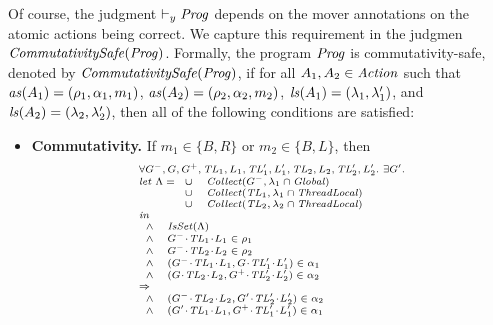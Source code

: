 Of course, the judgment $\vdash_y \mathit{Prog}$ depends on the mover annotations on the atomic actions being correct.
We capture this requirement in the judgmen $\mathit{CommutativitySafe}(\mathit{Prog})$.
Formally, the program $\mathit{Prog}$ is commutativity-safe, denoted by $\mathit{CommutativitySafe}(\mathit{Prog})$,
if for all $A_1,A_2 \in \mathit{Action}$ such that $\mathit{as}(A_1) = (\rho_1,\alpha_1,m_1)$, $\mathit{as}(A_2) = (\rho_2,\alpha_2,m_2)$,
$\mathit{ls}(A_1) = (\lambda_1,\lambda'_1)$, and $\mathit{ls}(A_2) = (\lambda_2,\lambda'_2)$, 
then all of the following conditions are satisfied:
\begin{itemize}
\item {\bf Commutativity.}
If $m_1 \in \{B,R\}$ or $m_2 \in \{B,L\}$, then 
\[
\scriptsize{
\begin{array}{l}
\forall \varsG^-,\varsG,\varsG^+,\varsTL_1,\varsL_1,\varsTL'_1,\varsL'_1,\varsTL_2,\varsL_2,\varsTL'_2,\varsL'_2.\ \exists \varsG'. \\
\mathit{let}\ \Lambda =
\begin{array}[t]{ll}
\cup & \Collect(\varsG^-, \lins_1 \cap \Global) \\
\cup & \Collect(\varsTL_1, \lins_1 \cap \ThreadLocal) \\
\cup & \Collect(\varsTL_2, \lins_2 \cap \ThreadLocal) 
\end{array} \\
\mathit{in} \\
\begin{array}{ll}
\wedge & \IsSet(\Lambda) \\
\wedge & \MakeStore{\varsG^-}{\varsTL_1}{\varsL_1} \in \rho_1 \\
\wedge & \MakeStore{\varsG^-}{\varsTL_2}{\varsL_2} \in \rho_2 \\
\wedge & (\MakeStore{\varsG^-}{\varsTL_1}{\varsL_1},\MakeStore{\varsG}{\varsTL'_1}{\varsL'_1}) \in \alpha_1 \\
\wedge & (\MakeStore{\varsG}{\varsTL_2}{\varsL_2},\MakeStore{\varsG^+}{\varsTL'_2}{\varsL'_2}) \in \alpha_2 \\
\end{array} \\
\Rightarrow \\
\begin{array}{ll}
\wedge & (\MakeStore{\varsG^-}{\varsTL_2}{\varsL_2},\MakeStore{\varsG'}{\varsTL'_2}{\varsL'_2}) \in \alpha_2 \\
\wedge & (\MakeStore{\varsG'}{\varsTL_1}{\varsL_1},\MakeStore{\varsG^+}{\varsTL'_1}{\varsL'_1}) \in \alpha_1 \\
\end{array}
\end{array}
}
\]


\end{itemize}
